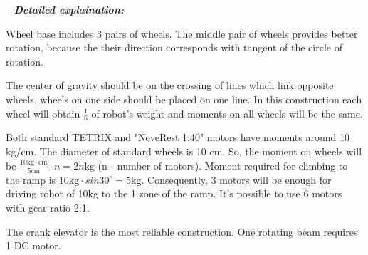    \newline
  \textit{\textbf{Detailed explaination:}}
  \begin{enumerate*}
  	\item Wheel base includes 3 pairs of wheels. The middle pair of wheels provides better rotation, because the their direction corresponds with tangent of the circle of rotation.
  	
  	The center of gravity should be on the crossing of lines which link opposite wheels. wheels on one side should be placed on one line. In this construction each wheel will obtain $\frac{1}{6}$ of robot's weight and moments on all wheels will be the same. 
  	\begin{figure}[H]
  		\begin{minipage}[h]{1\linewidth}
  		  \caption{}
  		\end{minipage}
  	\end{figure}
  	
  	\item Both standard TETRIX and "NeveRest 1:40" motors have moments around 10 kg/cm. The diameter of standard wheels is 10 cm. So, the moment on wheels will be $\frac{10\text{kg} \cdot \text{cm}}{5\text{cm}} \cdot n = 2n\text{kg}$ (n - number of motors). Moment required for climbing to the ramp is $10\text{kg} \cdot sin30^\circ = 5\text{kg}$. Consequently, 3 motors will be enough for driving robot of 10kg to the 1 zone of the ramp. It's possible to use 6 motors with gear ratio 2:1.
  	\item The crank elevator is the most reliable construction. One rotating beam requires 1 DC motor.
  	

\end{enumerate*}
